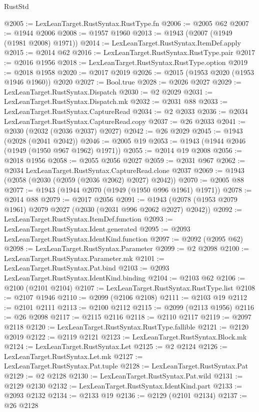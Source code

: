 \begin{lexlean}{RustStd}
\begin{coremodule}
@2005 := LexLeanTarget.RustSyntax.RustType.fn
@2006 := @2005 @62
@2007 := @1944 @2006
@2008 := @1957 @1960
@2013 := @1943 (@2007 (@1949 (@1981 @2008) @1971))
@2014 := LexLeanTarget.RustSyntax.ItemDef.apply
@2015 := @2014 @62
@2016 := LexLeanTarget.RustSyntax.RustType.pair
@2017 := @2016 @1956
@2018 := LexLeanTarget.RustSyntax.RustType.option
@2019 := @2018 @1958
@2020 := @2017 @2019
@2026 := @2015 (@1953 @2020 (@1953 @1946 @1960)) @2020
@2027 := Bool.true
@2028 := @2026 @2027
@2029 := LexLeanTarget.RustSyntax.Dispatch
@2030 := @2 @2029
@2031 := LexLeanTarget.RustSyntax.Dispatch.mk
@2032 := @2031 @88
@2033 := LexLeanTarget.RustSyntax.CaptureRead
@2034 := @2 @2033
@2036 := @2034 LexLeanTarget.RustSyntax.CaptureRead.copy
@2037 := @26 @2033
@2041 := @2030 (@2032 (@2036 @2037) @2027)
@2042 := @26 @2029
@2045 := @1943 (@2028 (@2041 @2042))
@2046 := @2005 @19
@2053 := @1943 (@1944 @2046 (@1949 (@1950 @967 @1962) @1971))
@2055 := @2014 @19 @2008
@2056 := @2018 @1956
@2058 := @2055 @2056 @2027
@2059 := @2031 @967
@2062 := @2034 LexLeanTarget.RustSyntax.CaptureRead.clone @2037
@2069 := @1943 (@2058 (@2030 (@2059 (@2036 @2062) @2027) @2042))
@2070 := @2005 @88
@2077 := @1943 (@1944 @2070 (@1949 (@1950 @996 @1961) @1971))
@2078 := @2014 @88
@2079 := @2017 @2056
@2091 := @1943 (@2078 (@1953 @2079 @1961) @2079 @2027 (@2030 (@2031 @996 @2062 @2027) @2042))
@2092 := LexLeanTarget.RustSyntax.ItemDef.function
@2093 := LexLeanTarget.RustSyntax.Ident.generated
@2095 := @2093 LexLeanTarget.RustSyntax.IdentKind.function
@2097 := @2092 (@2095 @62)
@2098 := LexLeanTarget.RustSyntax.Parameter
@2099 := @2 @2098
@2100 := LexLeanTarget.RustSyntax.Parameter.mk
@2101 := LexLeanTarget.RustSyntax.Pat.bind
@2103 := @2093 LexLeanTarget.RustSyntax.IdentKind.binding
@2104 := @2103 @62
@2106 := @2100 (@2101 @2104)
@2107 := LexLeanTarget.RustSyntax.RustType.list
@2108 := @2107 @1946
@2110 := @2099 (@2106 @2108)
@2111 := @2103 @19
@2112 := @2101 @2111
@2113 := @2100 @2112
@2115 := @2099 (@2113 @1956)
@2116 := @26 @2098
@2117 := @2115 @2116
@2118 := @2110 @2117
@2119 := @2097 @2118
@2120 := LexLeanTarget.RustSyntax.RustType.fallible
@2121 := @2120 @2019
@2122 := @2119 @2121
@2123 := LexLeanTarget.RustSyntax.Block.mk
@2124 := LexLeanTarget.RustSyntax.Let
@2125 := @2 @2124
@2126 := LexLeanTarget.RustSyntax.Let.mk
@2127 := LexLeanTarget.RustSyntax.Pat.tuple
@2128 := LexLeanTarget.RustSyntax.Pat
@2129 := @2 @2128
@2130 := LexLeanTarget.RustSyntax.Pat.wild
@2131 := @2129 @2130
@2132 := LexLeanTarget.RustSyntax.IdentKind.part
@2133 := @2093 @2132
@2134 := @2133 @19
@2136 := @2129 (@2101 @2134)
@2137 := @26 @2128

\end{coremodule}
\end{lexlean}
